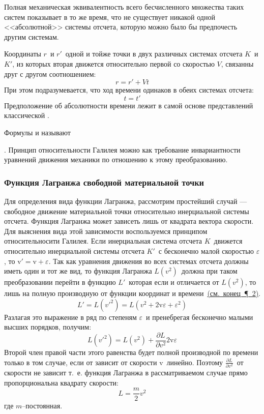 Полная механическая эквивалентность всего бесчисленного множества таких
систем показывает в то же время, что не существует никакой одной
<<абсолютной>> системы отсчета, которую можно было бы предпочесть другим
системам.


Координаты $r$\, и $r'$\, одной и тойже точки в двух различных системах
отсчета $K$\, и $K'$, из которых вторая движется относительно первой
со скоростью $V$, связанны друг с другом соотношением:
\begin{equation}\label{mech10}
r = r' + Vt
\end{equation}
При этом подразумевается, что ход времени одинаков в обеих системах
отсчета:
\begin{equation}\label{mech11}
t = t'
\end{equation}
Предположение об абсолютности времени лежит в самой основе представлений
классической .


Формулы  и  называют
\parbox{133.7pt}{}.
Принцип относительности Галилея можно  как
требование инвариантности уравнений движения механики по отношению
к этому преобразованию.

\subsubsection{Функция Лагранжа свободной материальной точки}
Для определения вида функции Лагранжа, рассмотрим простейший случай ---
свободное движение материальной точки относительно инерциальной системы
отсчета. Функция Лагранжа может зависеть лишь от квадрата вектора скорости.
Для выяснения вида этой зависимости воспользуемся принципом
относительносити Галилея. Если инерциальная система отсчета $K$\, движется
относительно инерциальной системы отсчета $K'$\, с бесконечно малой
скоростью $\varepsilon$, то $\mathrm{v}' = \mathrm{v} + \varepsilon$.
Так как уравнения движения во
всех системах отсчета должны иметь один и тот же вид, то функция Лагранжа
$L(v^2)$\, должна при таком преобразовании перейти в функцию $L'$\,
которая если и отличается от $L(v^2)$, то лишь на полную производную от
функции координат и
времени~\hyperlink{end_2}{\hypertarget{end_2_1}{(см.~конец~\P~2)}}.
$$
L'=L(v'^2) = L(v^2 + 2\mathrm{v}\varepsilon + \varepsilon^2)
$$
Разлагая это выражение в ряд по степеням $\varepsilon$\,  и пренебрегая
бесконечно малыми высших порядков, получим:
$$
L(v'^2) = L(v^2) + \frac{\partial L}{\partial v^2} 2\mathrm{v}\varepsilon
$$
Второй член правой части этого равенства будет полной производной по
времени только в том случае, если от зависит от скорости $\mathrm{v}$\,
линейно. Поэтому $\frac{\partial L}{\partial v^2}$\, от скорости не зависит
т.~е. функция Лагранжа в
рассматриваемом случае прямо пропорциональна квадрату скорости:
\begin{equation}\label{mech12}
L = \frac{m}{2}v^2
\end{equation}
где $m$--постоянная.


